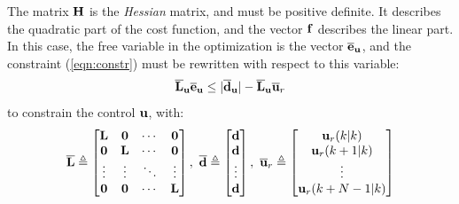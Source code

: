 \documentclass[twocolumn]{IEEEtran} %
\begin{document}
The matrix ${\bf H}$ is the {\em Hessian} matrix, and must be positive definite. It describes the quadratic part of the cost function, and the vector ${\bf f}$ describes the linear part. In this case, the free variable in the optimization is the vector $\overline{\bf e}_{\bf u}$, and the constraint (\ref{eqn:constr}) must be rewritten with respect to this variable:
\begin{equation*}
	\overline{\bf L}_{\bf u}\overline{\bf e}_{\bf u} \leq |\overline{\bf d}_{\bf u}| - \overline{\bf L}_{\bf u}\overline{\bf u}_r
\end{equation*}
to constrain the control ${\bf u}$, with:
\begin{equation*}
	\overline{\bf L} \triangleq \begin{bmatrix}
		{\bf L} & {\bf 0} & \cdots & {\bf 0} \\
		{\bf 0} & {\bf L} & \cdots & {\bf 0} \\
		\vdots  & \vdots  & \ddots & \vdots  \\
		{\bf 0} & {\bf 0} & \cdots & {\bf L}
	\end{bmatrix}, ~
	\overline{\bf d} \triangleq \begin{bmatrix}
		{\bf d} \\ {\bf d} \\ \vdots \\ {\bf d}
	\end{bmatrix}, ~
	\overline{\bf u}_r \triangleq \begin{bmatrix}
		{\bf u}_r(k|k) \\ {\bf u}_r(k+1|k) \\ \vdots \\ {\bf u}_r(k+N-1|k)
	\end{bmatrix}
\end{equation*}
\end{document}
